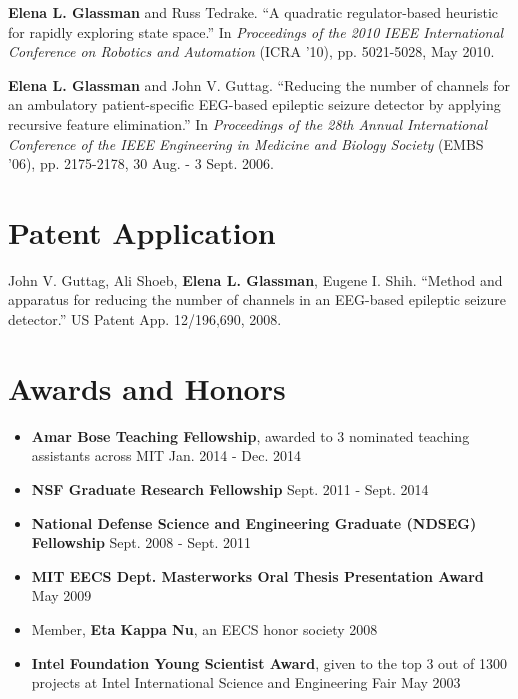 \documentclass[margin]{res}
\begin{document}
\begin{resume}
{\bf Elena L. Glassman} and Russ Tedrake. ``A quadratic regulator-based heuristic for rapidly exploring state space.'' In {\it Proceedings of the 2010 IEEE International Conference on Robotics and Automation} (ICRA '10), pp. 5021-5028, May 2010. 



{\bf Elena L. Glassman} and John V. Guttag. ``Reducing the number of channels for an ambulatory patient-specific EEG-based epileptic seizure detector by applying recursive feature elimination.'' In \textit{Proceedings of the 28th Annual International Conference of the IEEE Engineering in Medicine and Biology Society} (EMBS '06), pp. 2175-2178, 30 Aug. - 3 Sept. 2006.


\section{Patent Application}

John V. Guttag, Ali Shoeb, {\bf Elena L. Glassman}, Eugene I. Shih. ``Method and apparatus for reducing the number of channels in an EEG-based epileptic seizure detector.'' US Patent App. 12/196,690, 2008.



\section{Awards and Honors} 

\begin{itemize}[leftmargin=*] %
\item {\bf Amar Bose Teaching Fellowship}, awarded to 3 nominated teaching assistants across MIT \hfill Jan. 2014 - Dec. 2014
\item {\bf NSF Graduate Research Fellowship} \hfill Sept. 2011 - Sept. 2014
              \item {\bf National Defense Science and Engineering Graduate (NDSEG) \\ Fellowship} \hfill Sept. 2008 - Sept. 2011
          
\item {\bf MIT EECS Dept. Masterworks Oral Thesis Presentation Award} \hfill May 2009   
                \item Member, {\bf Eta Kappa Nu}, an EECS honor society \hfill 2008
                 \item {\bf Intel Foundation Young Scientist Award}, given to the top 3 out of 1300 projects at Intel International Science and Engineering Fair \hfill May 2003 
		 \end{itemize}


\end{resume}
\end{document}
